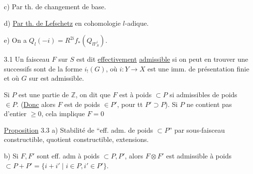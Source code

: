c) Par th. de changement de base.


d) \uline{Par th. de Lefschetz} en cohomologie $l$-adique.

e) On  a $Q_l(-i)=R^{2i}f_*(Q_{l\mathbb P^i_S})$.


3.1 Un faisceau $F$ sur $S$ est dit \uline{effectivement} \uline{admissible} si  on peut en trouver une   successifs sont de la forme $i_!(G)$, où $i:Y\to X$ est une  imm. de présentation finie et où $G$ sur  est  admissible.


 Si $P$ est une partie de $\mathbb Z$, on dit que $F$ est à poids $\subset P$ si   admissibles de poids $\in P$. (\uline{Donc}  alors $F$ est de poids $\in P'$, pour tt $P'\supset P$). Si  $P$ ne contient pas d'entier $\ge0$, cela implique $F=0$


\uline{Proposition} 3.3 \quad a) Stabilité de \textquotedblleft eff. adm. de poids $\subset P$\textquotedblright{} par sous-faisceau constructible, quotient constructible,  extensions.

b) Si $F,F'$ sont eff. adm à poids $\subset P,P'$, alors $F\otimes F'$ est admissible à poids $\subset P+P'=\{i+i'\mid i\in P,i'\in P'\}$.

